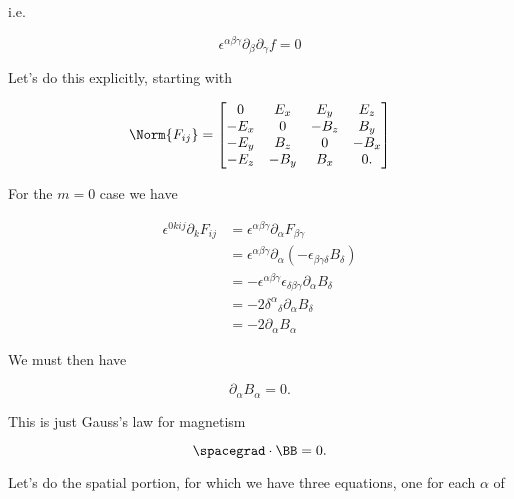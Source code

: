 i.e.

\begin{equation}\label{eqn:relativisticElectrodynamicsL11:810}
\epsilon^{\alpha\beta\gamma} \partial_\beta \partial_\gamma f = 0
\end{equation}

Let's do this explicitly, starting with

\begin{equation}\label{eqn:relativisticElectrodynamicsL10:370}
\Norm{ F_{i j} } = 
\begin{bmatrix}
0 & E_x & E_y & E_z \\
-E_x & 0 & -B_z & B_y \\
-E_y & B_z & 0 & -B_x \\
-E_z & -B_y & B_x & 0.
\end{bmatrix}
\end{equation}

For the $m= 0$ case we have

\begin{align*}
\epsilon^{0 k i j} \partial_k F_{i j}
&=
\epsilon^{\alpha \beta \gamma} \partial_\alpha F_{\beta \gamma} \\
&= 
\epsilon^{\alpha \beta \gamma} \partial_\alpha (-\epsilon_{\beta \gamma \delta} B_\delta) \\
&= 
-\epsilon^{\alpha \beta \gamma} \epsilon_{\delta \beta \gamma }
\partial_\alpha B_\delta \\
&= 
- 2 {\delta^\alpha}_\delta \partial_\alpha B_\delta \\
&= 
- 2 \partial_\alpha B_\alpha 
\end{align*}

We must then have

\begin{equation}\label{eqn:relativisticElectrodynamicsL11:830}
\partial_\alpha B_\alpha = 0.
\end{equation}

This is just Gauss's law for magnetism

\begin{equation}\label{eqn:relativisticElectrodynamicsL11:850}
\spacegrad \cdot \BB = 0.
\end{equation}

Let's do the spatial portion, for which we have three equations, one for each $\alpha$ of

